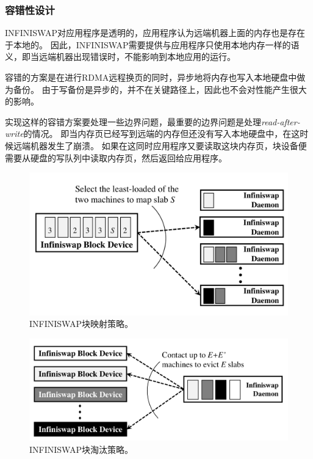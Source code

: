 \subsubsection{容错性设计}
INFINISWAP对应用程序是透明的，应用程序认为远端机器上面的内存也是存在于本地的。
因此，INFINISWAP需要提供与应用程序只使用本地内存一样的语义，即当远端机器出现错误时，不能影响到本地应用的运行。

容错的方案是在进行RDMA远程换页的同时，异步地将内存也写入本地硬盘中做为备份。
由于写备份是异步的，并不在关键路径上，因此也不会对性能产生很大的影响。

实现这样的容错方案要处理一些边界问题，最重要的边界问题是处理\emph{read-after-write}的情况。
即当内存页已经写到远端的内存但还没有写入本地硬盘中，在这时候远端机器发生了崩溃。
如果在这同时应用程序又要读取这块内存页，块设备便需要从硬盘的写队列中读取内存页，然后返回给应用程序。

\begin{figure}
\centering
\includegraphics[scale=0.3]{Figures/memory/infiniswap_slab_mapping.png}
\decoRule
\caption{INFINISWAP块映射策略。}
\label{fig:infiniswap_slab_mapping}
\end{figure}

\begin{figure}
\centering
\includegraphics[scale=0.3]{Figures/memory/infiniswap_slab_eviction.png}
\decoRule
\caption{INFINISWAP块淘汰策略。}
\label{fig:infiniswap_slab_eviction}
\end{figure}

